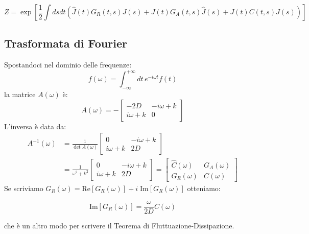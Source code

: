 \begin{tcolorbox}[colback=colorA!5, colframe=colorA, arc=3mm, boxrule=1.2pt]
\begin{equation*} 
Z = \exp\left[\frac{1}{2} \int ds dt \left( \hat{J}(t)G_R(t,s)J(s) + J(t)G_A(t,s)\hat{J}(s) + J(t)C(t,s)J(s) \right) \right] 
\end{equation*}
\end{tcolorbox}

\subsection{Trasformata di Fourier}
Spostandoci nel dominio delle frequenze:
\begin{equation*}
f(\omega) = \int_{-\infty}^{+\infty} dt \, e^{-i\omega t} f(t)
\end{equation*}
la matrice $A(\omega)$ è:
\begin{equation} 
A(\omega) = -\begin{bmatrix} -2D & -i\omega+k \\ i\omega+k & 0 \end{bmatrix} 
\end{equation}
L'inversa è data da:
\begin{align} 
A^{-1}(\omega) &= \frac{1}{\det A(\omega)} \begin{bmatrix} 0 & -i\omega+k \\ i\omega+k & 2D \end{bmatrix} \nonumber \\ 
&= \frac{1}{\omega^2+k^2} \begin{bmatrix} 0 & -i\omega+k \\ i\omega+k & 2D \end{bmatrix} = \begin{bmatrix} \hat{C}(\omega) & G_A(\omega) \\ G_R(\omega) & C(\omega) \end{bmatrix} 
\end{align}
Se scriviamo $G_R(\omega) = \text{Re}[G_R(\omega)] + i\; \text{Im}[G_R(\omega)]$ otteniamo:

\begin{tcolorbox}[colback=colorA!5, colframe=colorA, arc=3mm, boxrule=1.2pt]
\begin{equation} 
\text{Im}[G_R(\omega)] = \frac{\omega}{2D} C(\omega) 
\end{equation}
\end{tcolorbox}
che è un altro modo per scrivere il Teorema di Fluttuazione-Dissipazione.


